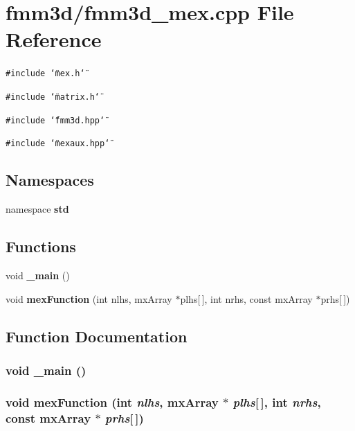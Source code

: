 \section{fmm3d/fmm3d\_\-mex.cpp File Reference}
\label{fmm3d__mex_8cpp}


{\tt \#include \char`\"{}mex.h\char`\"{}}\par
{\tt \#include \char`\"{}matrix.h\char`\"{}}\par
{\tt \#include \char`\"{}fmm3d.hpp\char`\"{}}\par
{\tt \#include \char`\"{}mexaux.hpp\char`\"{}}\par
\subsection*{Namespaces}
\begin{CompactItemize}
\item 
namespace {\bf std}
\end{CompactItemize}
\subsection*{Functions}
\begin{CompactItemize}
\item 
void {\bf \_\-main} ()
\item 
void {\bf mex\-Function} (int nlhs, mx\-Array $\ast$plhs[$\,$], int nrhs, const mx\-Array $\ast$prhs[$\,$])
\end{CompactItemize}


\subsection{Function Documentation}
\subsubsection{\setlength{\rightskip}{0pt plus 5cm}void \_\-main ()}\label{fmm3d__mex_8cpp_852f4ac42d214a224d24320ae7d8826c_852f4ac42d214a224d24320ae7d8826c}


\subsubsection{\setlength{\rightskip}{0pt plus 5cm}void mex\-Function (int {\em nlhs}, mx\-Array $\ast$ {\em plhs}[$\,$], int {\em nrhs}, const mx\-Array $\ast$ {\em prhs}[$\,$])}\label{fmm3d__mex_8cpp_8a1c8275cf3717164b4982b238e876c6_8a1c8275cf3717164b4982b238e876c6}




